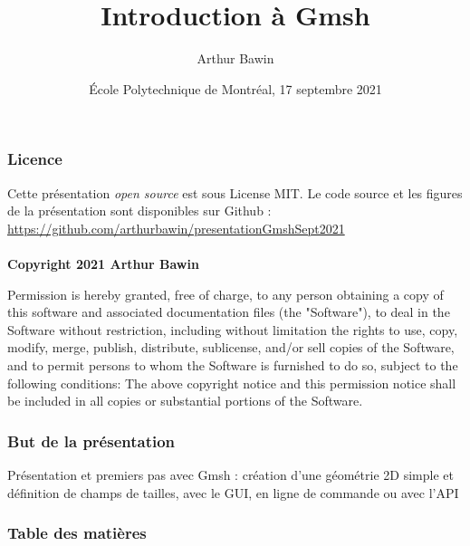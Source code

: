 \documentclass[aspectratio=169]{beamer}
\begin{document}

\title[Introduction à Gmsh]
{Introduction à Gmsh}

\subtitle{}

\author[Arthur Bawin]
{Arthur Bawin}


\date[EPM 2021] %
{École Polytechnique de Montréal, 17 septembre 2021}

\frame{\titlepage}

\begin{frame}
\frametitle{Licence}
Cette présentation \textit{open source} est sous License MIT. Le code source et les figures de la présentation sont disponibles sur Github : \url{https://github.com/arthurbawin/presentationGmshSept2021} \\
~\\
\textbf{ Copyright 2021 Arthur Bawin}

\footnotesize{Permission is hereby granted, free of charge, to any person obtaining a copy of this software and associated documentation files (the "Software"), to deal in the Software without restriction, including without limitation the rights to use, copy, modify, merge, publish, distribute, sublicense, and/or sell copies of the Software, and to permit persons to whom the Software is furnished to do so, subject to the following conditions:
The above copyright notice and this permission notice shall be included in all copies or substantial portions of the Software.}
\end{frame}

\begin{frame}[fragile]
\frametitle{But de la présentation}
Présentation et premiers pas avec Gmsh : création d'une géométrie 2D simple et définition de champs de tailles, avec le GUI, en ligne de commande ou avec l'API
\end{frame}

\begin{frame}
\frametitle{Table des matières}
\tableofcontents
\end{frame}
\end{document}
